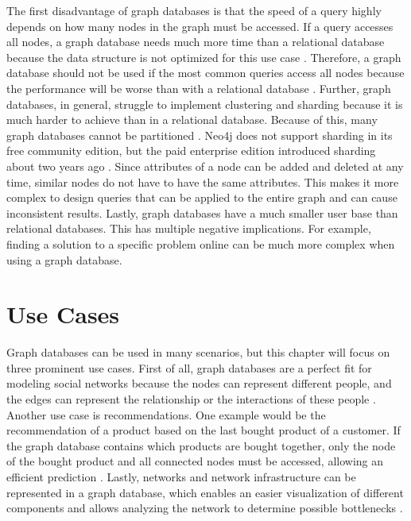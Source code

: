 The first disadvantage of graph databases is that the speed of a query highly depends on how many nodes in the graph must be accessed. If a query accesses all nodes, a graph database needs much more time than a relational database because the data structure is not optimized for this use case \parencite{adv_and_disadv_neo4j}. Therefore, a graph database should not be used if the most common queries access all nodes because the performance will be worse than with a relational database \parencite{comparison_neo4j}. 
Further, graph databases, in general, struggle to implement clustering and sharding because it is much harder to achieve than in a relational database. Because of this, many graph databases cannot be partitioned \parencite{comparison_neo4j}. Neo4j does not support sharding in its free community edition, but the paid enterprise edition introduced sharding about two years ago \parencite{use_cases_neo4j}. 
Since attributes of a node can be added and deleted at any time, similar nodes do not have to have the same attributes. This makes it more complex to design queries that can be applied to the entire graph and can cause inconsistent results. \parencite{comparison_neo4j}
Lastly, graph databases have a much smaller user base than relational databases. This has multiple negative implications. For example, finding a solution to a specific problem online can be much more complex when using a graph database. 

\section{Use Cases} \label{sec:useCasesNeo4j}

Graph databases can be used in many scenarios, but this chapter will focus on three prominent use cases. First of all, graph databases are a perfect fit for modeling social networks because the nodes can represent different people, and the edges can represent the relationship or the interactions of these people \parencite{use_cases_graph_databases}. 
Another use case is recommendations. One example would be the recommendation of a product based on the last bought product of a customer. If the graph database contains which products are bought together, only the node of the bought product and all connected nodes must be accessed, allowing an efficient prediction \parencite{use_cases_neo4j}. 
Lastly, networks and network infrastructure can be represented in a graph database, which enables an easier visualization of different components and allows analyzing the network to determine possible bottlenecks \parencite{use_cases_graph_databases}.

